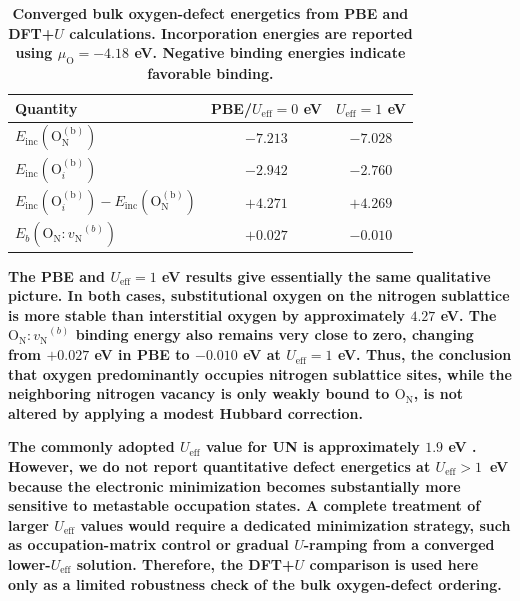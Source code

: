 \documentclass[preprint,12pt,sort&compress]{elsarticle}
\newcommand{\?}{\stackrel{?}{=}}
\providecommand{\DIFaddtex}[1]{{\bf #1}} %
\providecommand{\DIFaddFL}[1]{\DIFadd{#1}} %
\providecommand{\DIFadd}[1]{\texorpdfstring{\DIFaddtex{#1}}{#1}} %
\begin{document}
\begin{table}[h!]
\centering
\caption{\DIFaddFL{Converged bulk oxygen-defect energetics from PBE and DFT+$U$ calculations. Incorporation energies are reported using $\mu_\mathrm{O}=-4.18$ eV. Negative binding energies indicate favorable binding.}}
\footnotesize
\begin{tabular}{lcc}
\hline
\DIFaddFL{Quantity }& \DIFaddFL{PBE/$U_\text{eff}=0$ eV }& \DIFaddFL{$U_\text{eff}=1$ eV }\\
\hline
\DIFaddFL{$E_\text{inc}(\mathrm{O_N^{(b)}})$ }& \DIFaddFL{$-7.213$ }& \DIFaddFL{$-7.028$ }\\
\DIFaddFL{$E_\text{inc}(\text{O}_i^{(\text{b})})$ }& \DIFaddFL{$-2.942$ }& \DIFaddFL{$-2.760$ }\\
\DIFaddFL{$E_\text{inc}(\text{O}_i^{(\text{b})})-E_\text{inc}(\mathrm{O_N^{(b)}})$ }& \DIFaddFL{$+4.271$ }& \DIFaddFL{$+4.269$ }\\
\DIFaddFL{$E_b({\mathrm{O_N}:v_\mathrm{N}}^{(b)})$ }& \DIFaddFL{$+0.027$ }& \DIFaddFL{$-0.010$ }\\
\hline
\end{tabular}
\label{Tab:BulkUSens}
\end{table}

\DIFadd{The PBE and $U_\text{eff}=1$ eV results give essentially the same qualitative picture. In both cases, substitutional oxygen on the nitrogen sublattice is more stable than interstitial oxygen by approximately $4.27$ eV. The ${\mathrm{O_N}:v_\mathrm{N}}^{(b)}$ binding energy also remains very close to zero, changing from $+0.027$ eV in PBE to $-0.010$ eV at $U_\text{eff}=1$ eV. Thus, the conclusion that oxygen predominantly occupies nitrogen sublattice sites, while the neighboring nitrogen vacancy is only weakly bound to $\mathrm{O_N}$, is not altered by applying a modest Hubbard correction.
}

\DIFadd{The commonly adopted $U_\text{eff}$ value for UN is approximately $1.9$ eV \cite{Claisse2016b,Kocevski2022I}. However, we do not report quantitative defect energetics at $U_\text{eff} > 1$~eV because the electronic minimization becomes substantially more sensitive to metastable occupation states. A complete treatment of larger $U_\text{eff}$ values would require a dedicated minimization strategy, such as occupation-matrix control or gradual $U$-ramping from a converged lower-$U_\text{eff}$ solution. Therefore, the DFT+$U$ comparison is used here only as a limited robustness check of the bulk oxygen-defect ordering.
}
\end{document}
